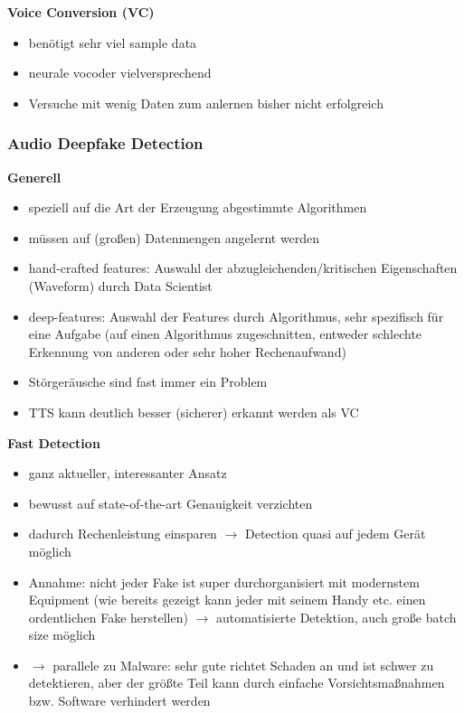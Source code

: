 \textbf{Voice Conversion (VC)}
\begin{itemize}
  \item benötigt sehr viel sample data
  \item neurale vocoder vielversprechend
  \item Versuche mit wenig Daten zum anlernen bisher nicht erfolgreich
\end{itemize}

\subsubsection{Audio Deepfake Detection}
\textbf{Generell}
\begin{itemize}
  \item speziell auf die Art der Erzeugung abgestimmte Algorithmen
  \item müssen auf (großen) Datenmengen angelernt werden
  \item hand-crafted features: Auswahl der abzugleichenden/kritischen Eigenschaften (Waveform) durch Data Scientist
  \item deep-features: Auswahl der Features durch Algorithmus, sehr spezifisch für eine Aufgabe (auf einen Algorithmus zugeschnitten, entweder schlechte Erkennung von anderen oder sehr hoher Rechenaufwand)
  \item Störgeräusche sind fast immer ein Problem
  \item TTS kann deutlich besser (sicherer) erkannt werden als VC
\end{itemize}

\textbf{Fast Detection}
\begin{itemize}
  \item ganz aktueller, interessanter Ansatz \citep[][]{Kawa2022}
  \item bewusst auf state-of-the-art Genauigkeit verzichten
  \item dadurch Rechenleistung einsparen $\rightarrow$ Detection quasi auf jedem Gerät möglich
  \item Annahme: nicht jeder Fake ist super durchorganisiert mit modernstem Equipment (wie bereits gezeigt kann jeder mit seinem Handy etc. einen ordentlichen Fake herstellen) $\rightarrow$ automatisierte Detektion, auch große batch size möglich
  \item $\rightarrow$ parallele zu Malware: sehr gute richtet Schaden an und ist schwer zu detektieren, aber der größte Teil kann durch \glqq{}einfache\grqq{} Vorsichtsmaßnahmen bzw. Software verhindert werden
\end{itemize}
